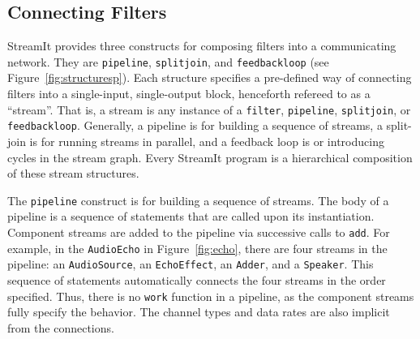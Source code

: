 \subsection{Connecting Filters}
\label{sec:connecting}

StreamIt provides three constructs for composing filters into a
communicating network. They are \texttt{pipeline}, \texttt{splitjoin}, and
\texttt{feedbackloop} (see Figure~\ref{fig:structuresp}).  Each
structure  specifies a pre-defined  way of  connecting filters  into a
single-input,  single-output   block,  henceforth  refereed   to  as  a
``stream''.  That is, a stream is any instance of a \texttt{filter},
\texttt{pipeline}, \texttt{splitjoin}, or \texttt{feedbackloop}. 
Generally,  a  pipeline is  for  building  a  sequence of  streams,  a
split-join is for running streams  in parallel, and a feedback loop is
or introducing cycles in the  stream graph.  Every StreamIt program is
a hierarchical composition of these stream structures.

The \texttt{pipeline} construct is for building a sequence of
streams.  The body of a pipeline is a sequence of statements that are
called upon its instantiation.  Component streams are added to the
pipeline via successive calls to \texttt{add}.  For example, in the
\texttt{AudioEcho} in Figure~\ref{fig:echo}, there are four streams in
the pipeline: an \texttt{AudioSource}, an \texttt{EchoEffect}, an
\texttt{Adder}, and a \texttt{Speaker}.  This sequence of statements
automatically connects the four streams in the order specified.
Thus, there is no \texttt{work} function in a pipeline, as the
component streams fully specify the behavior.  The channel types and
data rates are also implicit from the connections.



